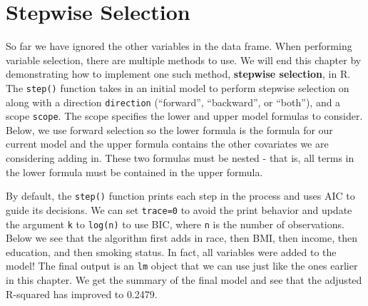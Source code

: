 \documentclass[
  letterpaper,
]{krantz}
\makeatletter
\newenvironment{Shaded}{\begin{snugshade}}{\end{snugshade}}
\newcommand{\CommentTok}[1]{\textcolor[rgb]{0.37,0.37,0.37}{#1}}
\newcommand{\DecValTok}[1]{\textcolor[rgb]{0.68,0.00,0.00}{#1}}
\newcommand{\FunctionTok}[1]{\textcolor[rgb]{0.28,0.35,0.67}{#1}}
\newcommand{\NormalTok}[1]{\textcolor[rgb]{0.00,0.23,0.31}{#1}}
\newcommand{\OtherTok}[1]{\textcolor[rgb]{0.00,0.23,0.31}{#1}}
\newcommand{\SpecialCharTok}[1]{\textcolor[rgb]{0.37,0.37,0.37}{#1}}
\newenvironment{kframe}{%
\medskip{}
\setlength{\fboxsep}{.8em}
 \def\at@end@of@kframe{}%
 \ifinner\ifhmode%
  \def\at@end@of@kframe{\end{minipage}}%
  \begin{minipage}{\columnwidth}%
 \fi\fi%
 \def\FrameCommand##1{\hskip\@totalleftmargin \hskip-\fboxsep
 \colorbox{shadecolor}{##1}\hskip-\fboxsep
     \hskip-\linewidth \hskip-\@totalleftmargin \hskip\columnwidth}%
 \MakeFramed {\advance\hsize-\width
   \@totalleftmargin\z@ \linewidth\hsize
   \@setminipage}}%
 {\par\unskip\endMakeFramed%
 \at@end@of@kframe}
\renewenvironment{Shaded}{\begin{kframe}}{\end{kframe}}
\makeatother
\begin{document}
\begin{Shaded}
\end{Shaded}

\begin{Shaded}
\end{Shaded}

\section{Stepwise Selection}\label{stepwise-selection}

So far we have ignored the other variables in the data frame. When
performing variable selection, there are multiple methods to use. We
will end this chapter by demonstrating how to implement one such method,
\textbf{stepwise selection}, in R. The \texttt{step()} function takes in
an initial model to perform stepwise selection on along with a direction
\texttt{direction} (``forward'', ``backward'', or ``both''), and a scope
\texttt{scope}. The scope specifies the lower and upper model formulas
to consider. Below, we use forward selection so the lower formula is the
formula for our current model and the upper formula contains the other
covariates we are considering adding in. These two formulas must be
nested - that is, all terms in the lower formula must be contained in
the upper formula.

By default, the \texttt{step()} function prints each step in the process
and uses AIC to guide its decisions. We can set \texttt{trace=0} to
avoid the print behavior and update the argument \texttt{k} to
\texttt{log(n)} to use BIC, where \texttt{n} is the number of
observations. Below we see that the algorithm first adds in race, then
BMI, then income, then education, and then smoking status. In fact, all
variables were added to the model! The final output is an \texttt{lm}
object that we can use just like the ones earlier in this chapter. We
get the summary of the final model and see that the adjusted R-squared
has improved to 0.2479.
\end{document}
